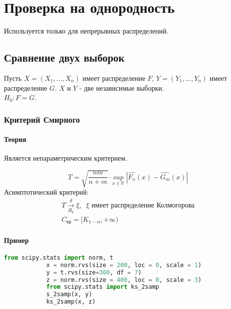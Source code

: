 \chapter{Проверка на однородность}\label{cha:uniform}

Используется только для непрерывных распределений.\\

\section{Сравнение двух выборок}\label{cha:uniform/sec:2}

Пусть $X = (X_1, \dots, X_n)$ имеет распределение $F$, $Y = (Y_1, \dots, Y_n)$ имеет распределение $G$. $X$ и $Y$ - две независимые выборки.\\
$H_0: F = G$.

	\subsection{Критерий Смирного}\label{cha:uniform/sec:2/smirn}

		\subsubsection*{Теория}\label{cha:uniform/sec:2/subsec:smirn/subsubsec:theory}

		Является непараметрическим критерием.

		$$T = \sqrt{\frac{n m }{n+m}}\cdot \underset{x \in \mathbb{R}}{sup} \; |\hat{F_n}(x) - \hat{G_m}(x)|$$
		Асимптотический критерий:
		$$\begin{gathered}
			T \xrightarrow[H_0]{d}\xi, \;\; \xi \text{ имеет распределение Колмогорова} \\
			C_{\text{кр}} = [K_{1-\alpha}, +\infty)
		\end{gathered}$$

		\subsubsection*{Пример}\label{cha:uniform/sec:2/subsec:smirn/subsubsec:prob}

		\begin{lstlisting}[language=Python]
			from scipy.stats import norm, t
			x = norm.rvs(size = 200, loc = 0, scale = 1)
			y = t.rvs(size=300, df = 7)
			z = norm.rvs(size = 400, loc = 0, scale = 3)
			from scipy.stats import ks_2samp
			s_2samp(x, y)
			ks_2samp(x, z)
		\end{lstlisting}

